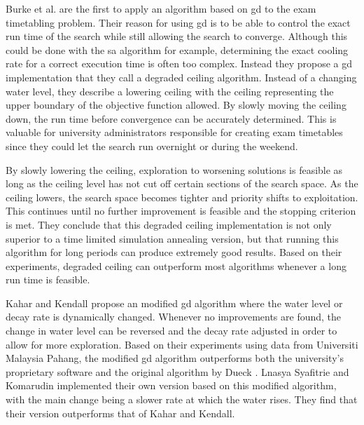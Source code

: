 Burke et al. \cite{burke2004GD} are the first to apply an algorithm based on \acrlong{gd} to the exam timetabling problem. Their reason for using \acrshort{gd} is to be able to control the exact run time of the search while still allowing the search to converge. Although this could be done with the \acrlong{sa} algorithm for example, determining the exact cooling rate for a correct execution time is often too complex. Instead they propose a \acrshort{gd} implementation that they call a degraded ceiling algorithm. Instead of a changing water level, they describe a lowering ceiling with the ceiling representing the upper boundary of the objective function allowed. By slowly moving the ceiling down, the run time before convergence can be accurately determined. This is valuable for university administrators responsible for creating exam timetables since they could let the search run overnight or during the weekend.

By slowly lowering the ceiling, exploration to worsening solutions is feasible as long as the ceiling level has not cut off certain sections of the search space. As the ceiling lowers, the search space becomes tighter and priority shifts to exploitation. This continues until no further improvement is feasible and the stopping criterion is met. They conclude that this degraded ceiling implementation is not only superior to a time limited simulation annealing version, but that running this algorithm for long periods can produce extremely good results. Based on their experiments, degraded ceiling can outperform most algorithms whenever a long run time is feasible.

Kahar and Kendall \cite{kahar2015} propose an modified \acrlong{gd} algorithm where the water level or decay rate is dynamically changed. Whenever no improvements are found, the change in water level can be reversed and the decay rate adjusted in order to allow for more exploration. Based on their experiments using data from Universiti Malaysia Pahang, the modified \acrshort{gd} algorithm outperforms both the university's proprietary software and the original algorithm by Dueck \cite{dueck1993}. Lnasya Syafitrie and Komarudin \cite{Lnasya2022} implemented their own version based on this modified algorithm, with the main change being a slower rate at which the water rises. They find that their version outperforms that of Kahar and Kendall.


